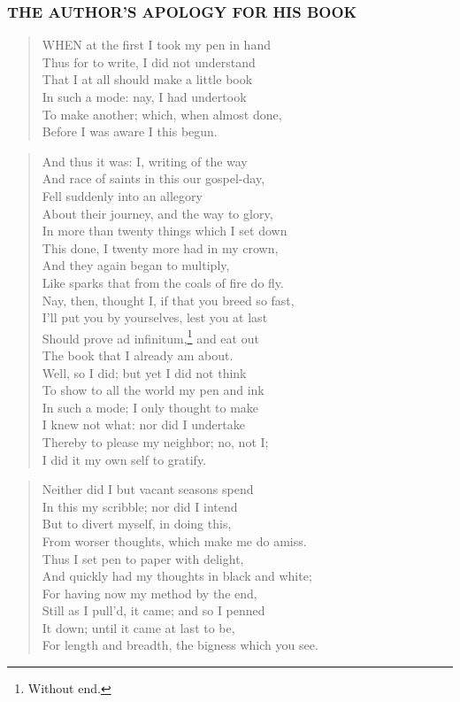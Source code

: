 \subsubsection[APOLOGY]{THE AUTHOR'S APOLOGY FOR HIS BOOK}
\begin{verse}
WHEN at the first I took my pen in hand\\
Thus for to write, I did not understand\\
That I at all should make a little book\\
In such a mode: nay, I had undertook\\
To make another; which, when almost done,\\
Before I was aware I this begun.\\
\end{verse}
\begin{verse}
And thus it was: I, writing of the way\\
And race of saints in this our gospel-day,\\
Fell suddenly into an allegory\\
About their journey, and the way to glory,\\
In more than twenty things which I set down\\
This done, I twenty more had in my crown,\\
And they again began to multiply,\\
Like sparks that from the coals of fire do fly.\\
Nay, then, thought I, if that you breed so fast,\\
I'll put you by yourselves, lest you at last\\
Should prove ad infinitum,\footnote{Without end.} and eat out\\
The book that I already am about.\\
Well, so I did; but yet I did not think\\
To show to all the world my pen and ink\\
In such a mode; I only thought to make\\
I knew not what: nor did I undertake\\
Thereby to please my neighbor; no, not I;\\
I did it my own self to gratify.\\
\end{verse}
\begin{verse}
Neither did I but vacant seasons spend\\
In this my scribble; nor did I intend\\
But to divert myself, in doing this,\\
From worser thoughts, which make me do amiss.\\
Thus I set pen to paper with delight,\\
And quickly had my thoughts in black and white;\\
For having now my method by the end,\\
Still as I pull'd, it came; and so I penned\\
It down; until it came at last to be,\\
For length and breadth, the bigness which you see.\\
\end{verse}

